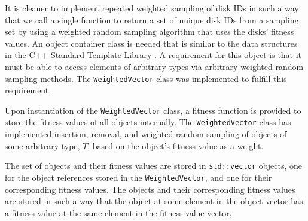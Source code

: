 \documentclass[12pt]{article}
\begin{document}
  It is cleaner to implement repeated weighted sampling of disk IDs in such a
  way that we call a single function to return a set of unique disk IDs from a
  sampling set by using a weighted random sampling algorithm that uses the disks'
  fitness values. An object container class is needed that is similar to the data
  structures in the C++ Standard Template Library \cite{stl}. A requirement for
  this object is that it must be able to access elements of arbitrary types via
  arbitrary weighted random sampling methods. The \texttt{WeightedVector} class
  was implemented to fulfill this requirement. 

  Upon instantiation of the \texttt{WeightedVector} class, a fitness function
  is provided to store the fitness values of all objects internally. The
  \texttt{WeightedVector} class has implemented insertion, removal, and
  weighted random sampling of objects of some arbitrary type, $T$, based on the
  object's fitness value as a weight.

  The set of objects and their fitness values are stored in
  \texttt{std::vector} objects, one for the object references stored in the
  \texttt{WeightedVector}, and one for their corresponding fitness values. The
  objects and their corresponding fitness values are stored in such a way that
  the object at some element in the object vector has a fitness value at the
  same element in the fitness value vector.
  
\end{document}
